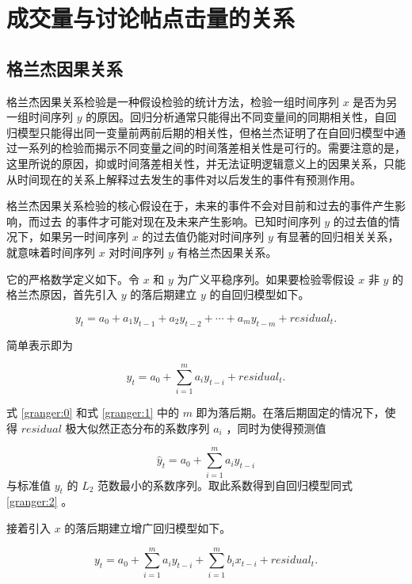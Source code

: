 \chapter{成交量与讨论帖点击量的关系}

\section{格兰杰因果关系}

格兰杰因果关系检验\cite{granger_causality}是一种假设检验的统计方法，检验一组时间序列 $x$ 是否为另一组时间序列 $y$ 的原因。回归分析通常只能得出不同变量间的同期相关性，自回归模型只能得出同一变量前两前后期的相关性，但格兰杰证明了在自回归模型中通过一系列的检验而揭示不同变量之间的时间落差相关性是可行的。需要注意的是，这里所说的原因，抑或时间落差相关性，并无法证明逻辑意义上的因果关系，只能从时间现在的关系上解释过去发生的事件对以后发生的事件有预测作用。

格兰杰因果关系检验的核心假设在于，未来的事件不会对目前和过去的事件产生影响，而过去
的事件才可能对现在及未来产生影响。已知时间序列 $y$ 的过去值的情况下，如果另一时间序列 $x$ 的过去值仍能对时间序列 $y$ 有显著的回归相关关系，就意味着时间序列 $x$ 对时间序列 $y$ 有格兰杰因果关系。

它的严格数学定义如下。令 $x$ 和 $y$ 为广义平稳序列。如果要检验零假设 $x$ 非 $y$ 的格兰杰原因，首先引入 $y$ 的落后期建立 $y$ 的自回归模型如下。

\begin{equation}
  \label{granger:0}
  y_{t}=a_{0}+a_{1}y_{t-1}+a_{2}y_{t-2}+\cdots+a_{m}y_{t-m}+residual_{t}.
\end{equation}

简单表示即为

\begin{equation}
  \label{granger:1}
  y_{t}=a_{0}+\sum_{i=1}^{m}a_{i}y_{t-i}+residual_{t}.
\end{equation}

式 \ref{granger:0} 和式 \ref{granger:1} 中的 $m$ 即为落后期。在落后期固定的情况下，使得 $residual$ 极大似然正态分布的系数序列 $a_{i}$ ，同时为使得预测值

\begin{equation}
  \label{granger:2}
  \hat{y}_{t}=a_{0}+\sum_{i=1}^{m}a_{i}y_{t-i}
\end{equation}
与标准值 $y_{t}$ 的 $L_{2}$ 范数最小的系数序列。取此系数得到自回归模型同式 \ref{granger:2} 。

接着引入 $x$ 的落后期建立增广回归模型如下。

\begin{equation}
  \label{granger:3}
  y_{t}=a_{0}+\sum_{i=1}^{m}a_{i}y_{t-i}+\sum_{i=1}^{m}b_{i}x_{t-i}+residual_{t}.
\end{equation}

